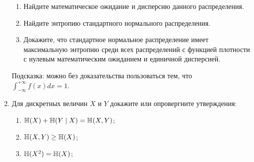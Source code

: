 \begin{enumerate}
\begin{enumerate}[resume]
    \item Найдите математическое ожидание и дисперсию данного распределения. 
    \item Найдите энтропию стандартного нормального распределения.     
    \item Докажите, что стандартное нормальное распределение имеет максимальную энтропию среди всех распределений с функцией плотности с нулевым математическим ожиданием и единичной дисперсией.
\end{enumerate}

Подсказка: можно без доказательства пользоваться тем, что $\int_{-\infty}^{+\infty} f(x) dx = 1$.

\item Для дискретных величин $X$ и $Y$ докажите или опровергните утверждения:
\begin{enumerate}
    \item $\operatorname{\mathbb{H}}(X) + \operatorname{\mathbb{H}}(Y \mid X) = \operatorname{\mathbb{H}}(X, Y)$;
    \item $\operatorname{\mathbb{H}}(X, Y) \geq \operatorname{\mathbb{H}}(X)$;
    \item $\operatorname{\mathbb{H}}(X^2) = \operatorname{\mathbb{H}}(X)$;
\end{enumerate}


\end{enumerate}


